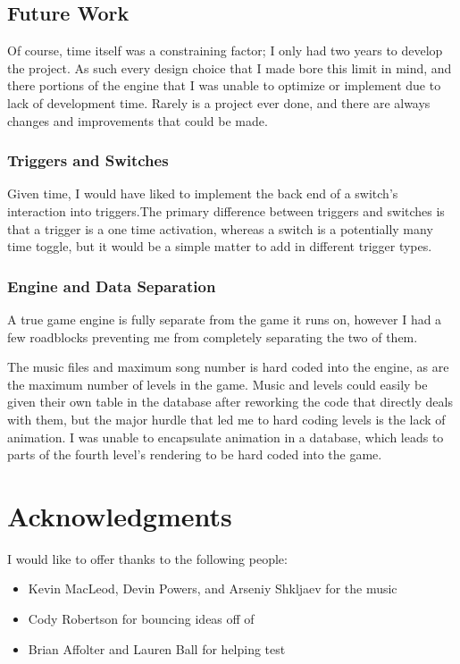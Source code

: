 \documentclass{article}
\begin{document}
\subsection{Future Work} \label{subsec:future}

Of course, time itself was a constraining factor; I only had two years to develop the project. As such every design choice that I made bore this limit in mind, and there portions of the engine that I was unable to optimize or implement due to lack of development time. Rarely is a project ever done, and there are always changes and improvements that could be made.

\subsubsection{Triggers and Switches} \label{subsubsec:trigandswitch}

Given time, I would have liked to implement the back end of a switch's interaction into triggers.The primary difference between triggers and switches is that a trigger is a one time activation, whereas a switch is a potentially many time toggle, but it would be a simple matter to add in different trigger types.

\subsubsection{Engine and Data Separation} \label{subsubsec:seperation}

A true game engine is fully separate from the game it runs on, however I had a few roadblocks preventing me from completely separating the two of them.

The music files and maximum song number is hard coded into the engine, as are the maximum number of levels in the game. Music and levels could easily be given their own table in the database after reworking the code that directly deals with them, but the major hurdle that led me to hard coding levels is the lack of animation. I was unable to encapsulate animation in a database, which leads to parts of the fourth level's rendering to be hard coded into the game.

\section{Acknowledgments} \label{sec:acknowledge}

I would like to offer thanks to the following people:

\begin{itemize}
	\item Kevin MacLeod, Devin Powers, and Arseniy Shkljaev for the music
	\item Cody Robertson for bouncing ideas off of
	\item Brian Affolter and Lauren Ball for helping test
\end{itemize}
\end{document}
